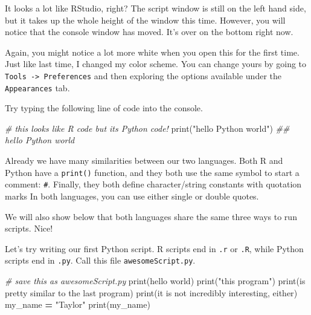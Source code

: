 \documentclass[
  12pt,
]{krantz}
\makeatletter
\newenvironment{Shaded}{\begin{snugshade}}{\end{snugshade}}
\newcommand{\BuiltInTok}[1]{#1}
\newcommand{\CommentTok}[1]{\textcolor[rgb]{0.37,0.37,0.37}{\textit{#1}}}
\newcommand{\NormalTok}[1]{#1}
\newcommand{\OperatorTok}[1]{\textcolor[rgb]{0.43,0.43,0.43}{\textbf{#1}}}
\newcommand{\StringTok}[1]{\textcolor[rgb]{0.5,0.5,0.5}{#1}}
\newenvironment{kframe}{%
\medskip{}
\setlength{\fboxsep}{.8em}
 \def\at@end@of@kframe{}%
 \ifinner\ifhmode%
  \def\at@end@of@kframe{\end{minipage}}%
  \begin{minipage}{\columnwidth}%
 \fi\fi%
 \def\FrameCommand##1{\hskip\@totalleftmargin \hskip-\fboxsep
 \colorbox{shadecolor}{##1}\hskip-\fboxsep
     \hskip-\linewidth \hskip-\@totalleftmargin \hskip\columnwidth}%
 \MakeFramed {\advance\hsize-\width
   \@totalleftmargin\z@ \linewidth\hsize
   \@setminipage}}%
 {\par\unskip\endMakeFramed%
 \at@end@of@kframe}
\renewenvironment{Shaded}{\begin{kframe}}{\end{kframe}}
\makeatother
\begin{document}
It looks a lot like RStudio, right? The script window is still on the left hand side, but it takes up the whole height of the window this time. However, you will notice that the console window has moved. It's over on the bottom right now.

Again, you might notice a lot more white when you open this for the first time. Just like last time, I changed my color scheme. You can change yours by going to \texttt{Tools\ -\textgreater{}\ Preferences} and then exploring the options available under the \texttt{Appearances} tab.

Try typing the following line of code into the console.

\begin{Shaded}
\begin{Highlighting}[]
\CommentTok{\# this looks like R code but it\textquotesingle{}s Python code!}
\BuiltInTok{print}\NormalTok{(}\StringTok{"hello Python world"}\NormalTok{)}
\CommentTok{\#\# hello Python world}
\end{Highlighting}
\end{Shaded}

Already we have many similarities between our two languages. Both R and Python have a \texttt{print()} function, and they both use the same symbol to start a comment: \texttt{\#}. Finally, they both define character/string constants with quotation marks In both languages, you can use either single or double quotes.

We will also show below that both languages share the same three ways to run scripts. Nice!

Let's try writing our first Python script. R scripts end in \texttt{.r} or \texttt{.R}, while Python scripts end in \texttt{.py}. Call this file \texttt{awesomeScript.py}.

\begin{Shaded}
\begin{Highlighting}[]
\CommentTok{\# save this as awesomeScript.py}
\BuiltInTok{print}\NormalTok{(}\StringTok{\textquotesingle{}hello world\textquotesingle{}}\NormalTok{)}
\BuiltInTok{print}\NormalTok{(}\StringTok{"this program"}\NormalTok{)}
\BuiltInTok{print}\NormalTok{(}\StringTok{\textquotesingle{}is pretty similar to the last program\textquotesingle{}}\NormalTok{)}
\BuiltInTok{print}\NormalTok{(}\StringTok{\textquotesingle{}it is not incredibly interesting, either\textquotesingle{}}\NormalTok{)}
\NormalTok{my\_name }\OperatorTok{=} \StringTok{"Taylor"}
\BuiltInTok{print}\NormalTok{(my\_name)}
\end{Highlighting}
\end{Shaded}
\end{document}
